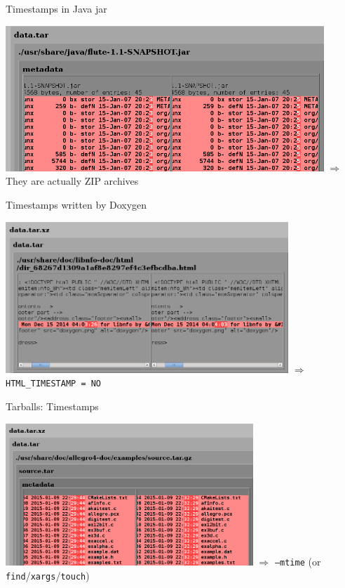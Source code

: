 \documentclass[14pt]{beamer}
\begin{document}
\begin{frame}{Timestamps in Java jar}
 \begin{center}
  \includegraphics[width=0.9\textwidth]{images/examples/timestamps_in_jar.png}
  \vfill
  $\Longrightarrow$ They are actually ZIP archives
 \end{center}
\end{frame}

\begin{frame}{Timestamps written by Doxygen}
 \begin{center}
  \includegraphics[width=0.8\textwidth]{images/examples/timestamps_by_doxygen.png}
  \vfill
  $\Longrightarrow$ \texttt{HTML\_TIMESTAMP = NO}
 \end{center}
\end{frame}

\begin{frame}{Tarballs: Timestamps}
 \begin{center}
  \includegraphics[width=0.7\textwidth]{images/examples/timestamps_in_tarball.png}
  \vfill
  $\Longrightarrow$ \texttt{--mtime} (or \texttt{find}/\texttt{xargs}/\texttt{touch})
 \end{center}
\end{frame}
\end{document}
